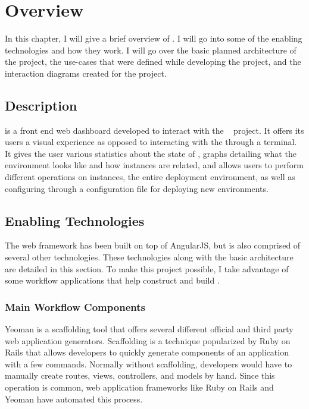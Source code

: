 
\cleardoublepage

\chapter{\projectName{} Overview}
\label{makereference2}

In this chapter, I will give a brief overview of \projectName{}. I will go into some of the enabling technologies and how they work. I will go over the basic planned architecture of the project, the use-cases that were defined while developing the project, and the interaction diagrams created for the project.

\section{Description}
\label{makereference2.1}

\projectName{} is a front end web dashboard developed to interact with the \ancor{} ~\cite{DMatrix:Unruh:2014} project. It offers its users a visual experience as opposed to interacting with the \ancorcli{} through a terminal. It gives the user various statistics about the state of \ancor{}, graphs detailing what the environment looks like and how instances are related, and allows users to perform different operations on instances, the entire deployment environment, as well as configuring \ancor{} through a configuration file for deploying new environments.

\section{Enabling Technologies}
\label{makereference2.2}

The web framework has been built on top of AngularJS, but is also comprised of several other technologies. These technologies along with the basic \projectName{} architecture are detailed in this section. To make this project possible, I take advantage of some workflow applications that help construct and build \projectName{}.

\subsection{Main Workflow Components}

Yeoman\cite{Note:Yeoman:2014} is a scaffolding tool that offers several different official and third party web application generators. Scaffolding is a technique popularized by Ruby on Rails that allows developers to quickly generate components of an application with a few commands. Normally without scaffolding, developers would have to manually create routes, views, controllers, and models by hand. Since this operation is common, web application frameworks like Ruby on Rails and Yeoman have automated this process.

